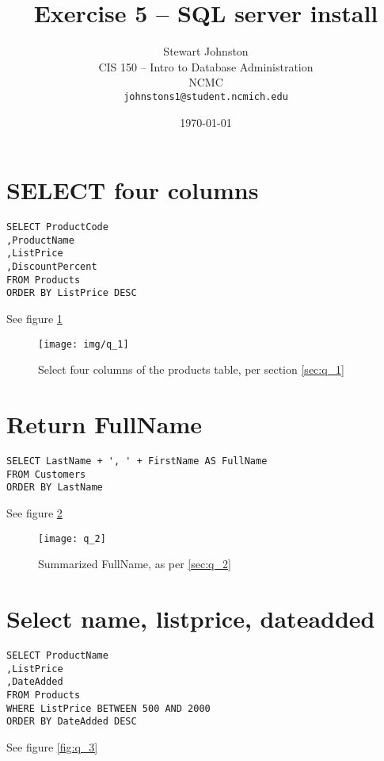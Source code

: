 \documentclass{article}
\title{Exercise 5 -- SQL server install}
\author{Stewart Johnston\\
  {CIS 150 -- Intro to Database Administration}\\
  {NCMC}\\
  {\texttt{johnstons1@student.ncmich.edu}}
}
\date{\today}
\begin{document}

\maketitle

\tableofcontents
\listoffigures

\section{SELECT four columns}

\begin{lstlisting}[float]
SELECT ProductCode
,ProductName
,ListPrice
,DiscountPercent
FROM Products
ORDER BY ListPrice DESC
\end{lstlisting}\label{sec:q_1}
See figure \ref{fig:q_1}

\begin{figure}[H]\centering
	\caption{Select four columns of the products table, per section
	\ref{sec:q_1}}
	\texttt{[image: img/q\_1]}
	\label{fig:q_1}
\end{figure}

\section{Return FullName}

\begin{lstlisting}[float]
SELECT LastName + ', ' + FirstName AS FullName
FROM Customers
ORDER BY LastName
\end{lstlisting}\label{sec:q_2}
See figure \ref{fig:q_2}

\begin{figure}[H]\centering
	\caption{Summarized FullName, as per \ref{sec:q_2}}
	\texttt{[image: q\_2]}
	\label{fig:q_2}
\end{figure}

\section{Select name, listprice, dateadded}

\begin{lstlisting}[float]
SELECT ProductName
,ListPrice
,DateAdded
FROM Products
WHERE ListPrice BETWEEN 500 AND 2000
ORDER BY DateAdded DESC
\end{lstlisting}\label{sec:q_3}
See figure \ref{fig:q_3}
\end{document}
